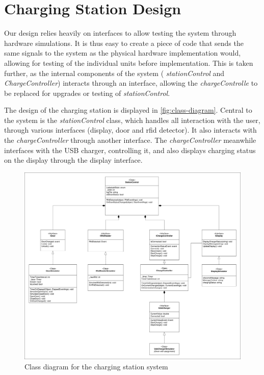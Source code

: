 \section{Charging Station Design}

Our design relies heavily on interfaces to allow testing the system through hardware simulations. It is thus easy to create a piece of code that sends the same signals to the system as the physical hardware implementation would, allowing for testing of the individual units before implementation. This is taken further, as the internal components of the system ( \textit{stationControl} and \textit{ChargeController}) interacts through an interface, allowing the \textit{chargeControlle} to be replaced for upgrades or testing of \textit{stationControl}.

\vspace{3em}

The design of the charging station is displayed in \autoref{fig:class-diagram}. Central to the system is the \textit{stationControl} class, which handles all interaction with the user, through various interfaces (display, door and rfid detector). It also interacts with the \textit{chargeController} through another interface. The \textit{chargeController} meanwhile interfaces with the USB charger, controlling it, and also displays charging status on the display through the display interface. 

\begin{figure}[h]
  \centering
  \includegraphics[width=\textwidth]{02-Body/images/ChargingStation_classDiagram.pdf}
  \caption{Class diagram for the charging station system}
  \label{fig:class-diagram}
\end{figure}

